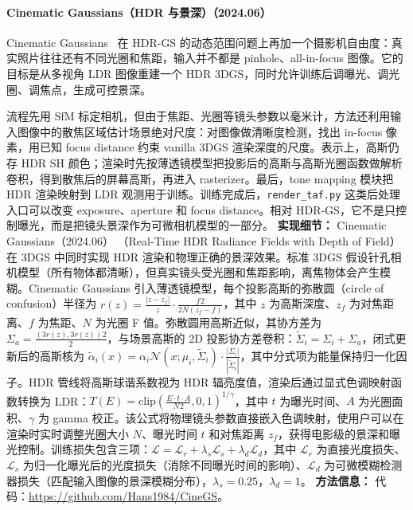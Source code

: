 \paragraph{Cinematic Gaussians（HDR 与景深）（2024.06）}
Cinematic Gaussians~\cite{2406_07329} 在 HDR-GS 的动态范围问题上再加一个摄影机自由度：真实照片往往还有不同光圈和焦距，输入并不都是 pinhole、all-in-focus 图像。它的目标是从多视角 LDR 图像重建一个 HDR 3DGS，同时允许训练后调曝光、调光圈、调焦点，生成可控景深。

流程先用 SfM 标定相机，但由于焦距、光圈等镜头参数以毫米计，方法还利用输入图像中的散焦区域估计场景绝对尺度：对图像做清晰度检测，找出 in-focus 像素，用已知 focus distance 约束 vanilla 3DGS 渲染深度的尺度。表示上，高斯仍存 HDR SH 颜色；渲染时先按薄透镜模型把投影后的高斯与高斯光圈函数做解析卷积，得到散焦后的屏幕高斯，再进入 rasterizer。最后，tone mapping 模块把 HDR 渲染映射到 LDR 观测用于训练。训练完成后，\texttt{render\_taf.py} 这类后处理入口可以改变 exposure、aperture 和 focus distance。相对 HDR-GS，它不是只控制曝光，而是把镜头景深作为可微相机模型的一部分。
\textbf{实现细节：} Cinematic Gaussians（2024.06） （Real-Time HDR Radiance Fields with Depth of Field）在 3DGS 中同时实现 HDR 渲染和物理正确的景深效果。标准 3DGS 假设针孔相机模型（所有物体都清晰），但真实镜头受光圈和焦距影响，离焦物体会产生模糊。Cinematic Gaussians 引入薄透镜模型，每个投影高斯的弥散圆（circle of confusion）半径为 $r(z) = \frac{|z - z_f|}{z} \cdot \frac{f^{}2}{2N(z_f - f)}$，其中 $z$ 为高斯深度、$z_f$ 为对焦距离、$f$ 为焦距、$N$ 为光圈 F 值。弥散圆用高斯近似，其协方差为 $\Sigma_a = \frac{(3r(z), 3r(z))^{}2}{2}$，与场景高斯的 2D 投影协方差卷积：$\tilde{\Sigma}_i = \Sigma_i + \Sigma_a$，闭式更新后的高斯核为 $\tilde{\alpha}_i(x) = \alpha_i \mathcal{N}(x; \mu_i, \tilde{\Sigma}_i) \cdot \frac{|\Sigma_i|}{|\tilde{\Sigma}_i|}$，其中分式项为能量保持归一化因子。HDR 管线将高斯球谐系数视为 HDR 辐亮度值，渲染后通过显式色调映射函数转换为 LDR：$T(E) = \mathrm{clip}(\frac{E \cdot t \cdot A}{N^{}2}, 0, 1)^{1/\gamma}$，其中 $t$ 为曝光时间、$A$ 为光圈面积、$\gamma$ 为 gamma 校正。该公式将物理镜头参数直接嵌入色调映射，使用户可以在渲染时实时调整光圈大小 $N$、曝光时间 $t$ 和对焦距离 $z_f$，获得电影级的景深和曝光控制。训练损失包含三项：$\mathcal{L} = \mathcal{L}_r + \lambda_s \mathcal{L}_s + \lambda_d \mathcal{L}_d$，其中 $\mathcal{L}_r$ 为直接光度损失、$\mathcal{L}_s$ 为归一化曝光后的光度损失（消除不同曝光时间的影响）、$\mathcal{L}_d$ 为可微模糊检测器损失（匹配输入图像的景深模糊分布），$\lambda_s = 0.25$，$\lambda_d = 1$。
\textbf{方法信息：} 代码：\url{https://github.com/Hans1984/CineGS}。

